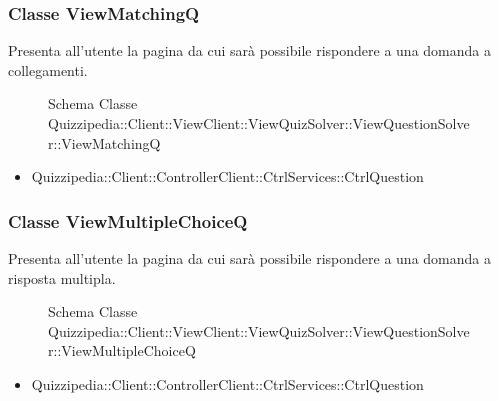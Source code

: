 \subsubsection{Classe ViewMatchingQ}
Presenta all'utente la pagina da cui sarà possibile rispondere a una domanda a collegamenti.
\begin{figure}[H]
\centering
\noindent{}
\caption{Schema Classe Quizzipedia::Client::ViewClient::ViewQuizSolver::ViewQuestionSolver::ViewMatchingQ}
\end{figure}
\begin{itemize}
\item Quizzipedia::Client::ControllerClient::CtrlServices::CtrlQuestion
\end{itemize}
\subsubsection{Classe ViewMultipleChoiceQ}
Presenta all'utente la pagina da cui sarà possibile rispondere a una domanda a risposta multipla.
\begin{figure}[H]
\centering
\noindent{}
\caption{Schema Classe Quizzipedia::Client::ViewClient::ViewQuizSolver::ViewQuestionSolver::ViewMultipleChoiceQ}
\end{figure}
\begin{itemize}
\item Quizzipedia::Client::ControllerClient::CtrlServices::CtrlQuestion
\end{itemize}
